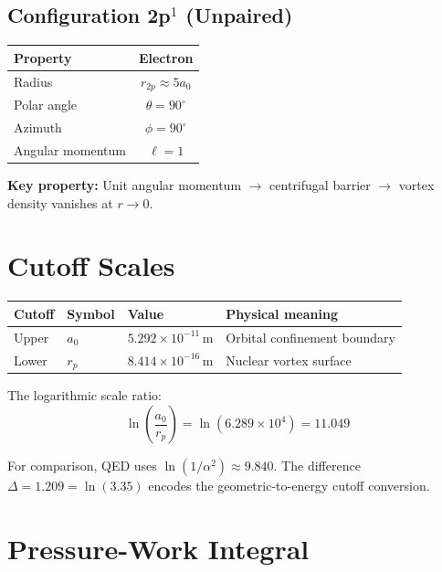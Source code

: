 \subsection{Configuration 2p$^1$ (Unpaired)}

\begin{center}
\begin{tabular}{lc}
\hline
Property & Electron \\
\hline
Radius & $r_{2p} \approx 5a_0$ \\
Polar angle & $\theta = 90^\circ$ \\
Azimuth & $\phi = 90^\circ$ \\
Angular momentum & $\ell = 1$ \\
\hline
\end{tabular}
\end{center}

\noindent\textbf{Key property:} Unit angular momentum $\to$ centrifugal barrier $\to$ vortex density vanishes at $r \to 0$.


\section{Cutoff Scales}

\begin{center}
\begin{tabular}{llll}
\hline
\textbf{Cutoff} & \textbf{Symbol} & \textbf{Value} & \textbf{Physical meaning} \\
\hline
Upper & $a_0$ & $5.292 \times 10^{-11}$\,m & Orbital confinement boundary \\
Lower & $r_p$ & $8.414 \times 10^{-16}$\,m & Nuclear vortex surface \\
\hline
\end{tabular}
\end{center}

The logarithmic scale ratio:
\begin{equation}
  \ln\!\left(\frac{a_0}{r_p}\right) = \ln(6.289 \times 10^4) = 11.049
\end{equation}

For comparison, QED uses $\ln(1/\alpha^2) \approx 9.840$.  The difference $\Delta = 1.209 = \ln(3.35)$ encodes the geometric-to-energy cutoff conversion.


\section{Pressure-Work Integral}

